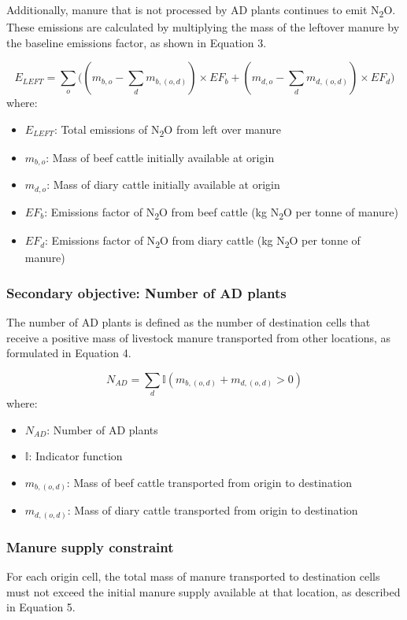 \documentclass[12pt]{article}
\begin{document}
Additionally, manure that is not processed by AD plants continues to emit N\textsubscript{2}O. These emissions are calculated by multiplying the mass of the leftover manure by the baseline emissions factor, as shown in Equation 3.

\begin{equation}
  E_{LEFT} = \sum_o\biggl((m_{b,o} - \sum_d m_{b, (o, d)}) \times EF_{b} + (m_{d,o} - \sum_d m_{d, (o, d)}) \times EF_d \biggr)
\end{equation}
where:
\begin{itemize}
  \item $E_{LEFT}$: Total emissions of N\textsubscript{2}O from left over manure
  \item $m_{b,o}$: Mass of beef cattle initially available at origin
  \item $m_{d,o}$: Mass of diary cattle initially available at origin
  \item $EF_b$: Emissions factor of N\textsubscript{2}O from beef cattle (kg N\textsubscript{2}O per tonne of manure)
  \item $EF_d$: Emissions factor of N\textsubscript{2}O from diary cattle (kg N\textsubscript{2}O per tonne of manure)
\end{itemize}

\subsubsection*{Secondary objective: Number of AD plants}

The number of AD plants is defined as the number of destination cells that receive a positive mass of livestock manure transported from other locations, as formulated in Equation 4.

\begin{equation}
  N_{AD} = \sum_d \mathbb{I}(m_{b, (o, d)} + m_{d, (o, d)} > 0)
\end{equation}
where:
\begin{itemize}
  \item $N_{AD}$: Number of AD plants
  \item $\mathbb{I}$: Indicator function
  \item $m_{b, (o, d)}$: Mass of beef cattle transported from origin to destination
  \item $m_{d, (o, d)}$: Mass of diary cattle transported from origin to destination
\end{itemize}

\subsubsection*{Manure supply constraint}
For each origin cell, the total mass of manure transported to destination cells must not exceed the initial manure supply available at that location, as described in Equation 5.
\end{document}
